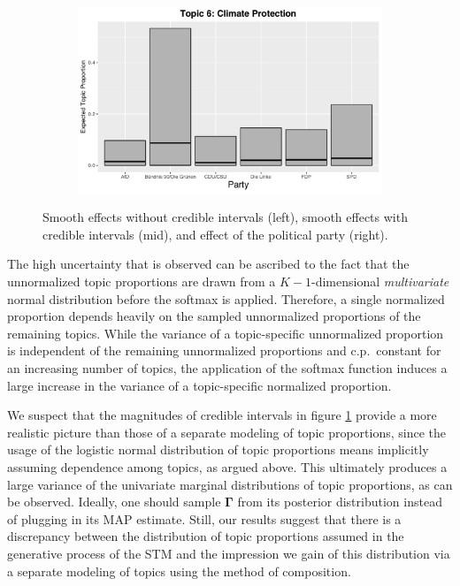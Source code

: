 \begin{figure}[h!]
\begin{subfigure}[b]{0.3\linewidth}
    \includegraphics[width=\linewidth]{../plots/5_1/direct_t6_cat.pdf}
  \end{subfigure}
  \caption{Smooth effects without credible intervals (left), smooth effects with credible intervals (mid), and effect of the political party (right).}
  \label{fig:directassessment}
\end{figure}

The high uncertainty that is observed can be ascribed to the fact that the unnormalized topic proportions are drawn from a $K-1$-dimensional \textit{multivariate} normal distribution before the softmax is applied. Therefore, a single normalized proportion depends heavily on the sampled unnormalized proportions of the remaining topics. While the variance of a topic-specific unnormalized proportion is independent of the remaining unnormalized proportions and c.p.\ constant for an increasing number of topics, the application of the softmax function induces a large increase in the variance of a topic-specific normalized proportion.

We suspect that the magnitudes of credible intervals in figure \ref{fig:directassessment} provide a more realistic picture than those of a separate modeling of topic proportions, since the usage of the logistic normal distribution of topic proportions means implicitly assuming dependence among topics, as argued above. This ultimately produces a large variance of the univariate marginal distributions of topic proportions, as can be observed. Ideally, one should sample $\boldsymbol{\Gamma}$ from its posterior distribution instead of plugging in its MAP estimate. Still, our results suggest that there is a discrepancy between the distribution of topic proportions assumed in the generative process of the STM and the impression we gain of this distribution via a separate modeling of topics using the method of composition.


